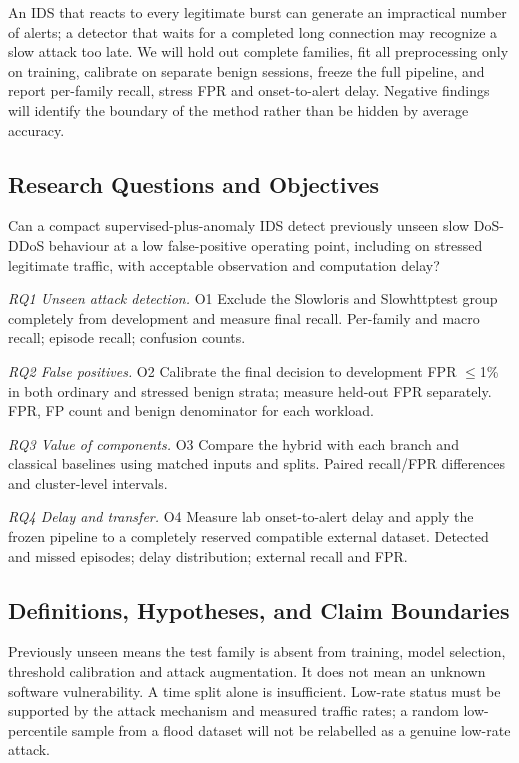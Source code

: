 \documentclass[conference]{IEEEtran}
\begin{document}
An IDS that reacts to every legitimate burst can generate an impractical number of alerts; a detector that waits for a completed long connection may recognize a slow attack too late. We will hold out complete families, fit all preprocessing only on training, calibrate on separate benign sessions, freeze the full pipeline, and report per-family recall, stress FPR and onset-to-alert delay. Negative findings will identify the boundary of the method rather than be hidden by average accuracy.

\subsection{Research Questions and Objectives}
Can a compact supervised-plus-anomaly IDS detect previously unseen slow DoS-DDoS behaviour at a low false-positive operating point, including on stressed legitimate traffic, with acceptable observation and computation delay?

\noindent\textit{RQ1 Unseen attack detection.} O1 Exclude the Slowloris and Slowhttptest group completely from development and measure final recall. Per-family and macro recall; episode recall; confusion counts.

\noindent\textit{RQ2 False positives.} O2 Calibrate the final decision to development FPR $\leq$1\% in both ordinary and stressed benign strata; measure held-out FPR separately. FPR, FP count and benign denominator for each workload.

\noindent\textit{RQ3 Value of components.} O3 Compare the hybrid with each branch and classical baselines using matched inputs and splits. Paired recall/FPR differences and cluster-level intervals.

\noindent\textit{RQ4 Delay and transfer.} O4 Measure lab onset-to-alert delay and apply the frozen pipeline to a completely reserved compatible external dataset. Detected and missed episodes; delay distribution; external recall and FPR.

\subsection{Definitions, Hypotheses, and Claim Boundaries}
Previously unseen means the test family is absent from training, model selection, threshold calibration and attack augmentation. It does not mean an unknown software vulnerability. A time split alone is insufficient. Low-rate status must be supported by the attack mechanism and measured traffic rates; a random low-percentile sample from a flood dataset will not be relabelled as a genuine low-rate attack.
\end{document}
